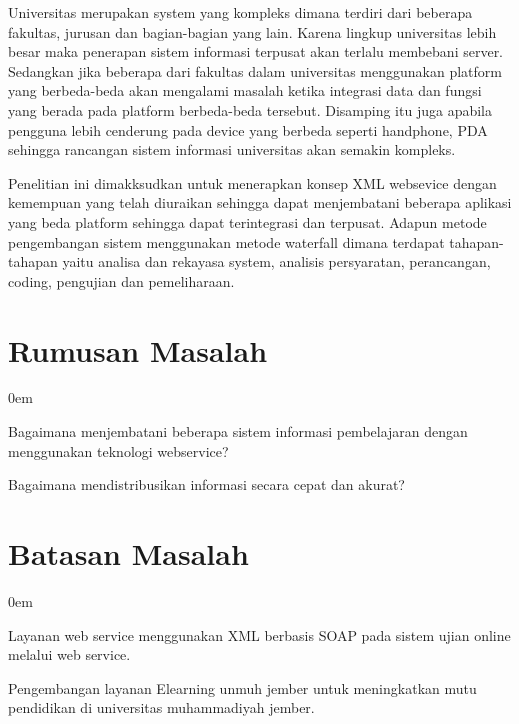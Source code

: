 \documentclass{jtetiproposalskripsi}
\begin{document}
Universitas merupakan system yang kompleks dimana terdiri dari beberapa fakultas, jurusan dan bagian-bagian yang lain. Karena lingkup universitas lebih besar maka penerapan sistem informasi terpusat akan terlalu membebani server.  Sedangkan jika beberapa dari fakultas dalam universitas menggunakan platform yang berbeda-beda akan mengalami masalah ketika integrasi data dan fungsi yang berada pada platform berbeda-beda tersebut. Disamping itu juga apabila pengguna lebih cenderung pada device yang berbeda seperti handphone, PDA sehingga rancangan sistem informasi universitas akan semakin kompleks.

Penelitian ini dimakksudkan untuk menerapkan konsep XML websevice dengan kemempuan yang telah diuraikan sehingga dapat menjembatani beberapa aplikasi yang beda platform sehingga dapat terintegrasi dan terpusat. Adapun metode pengembangan sistem menggunakan metode waterfall dimana terdapat tahapan-tahapan yaitu analisa dan rekayasa system, analisis persyaratan, perancangan, coding, pengujian dan pemeliharaan.



\section{Rumusan Masalah}
\vspace{-0.5cm}

\begin{enumerate}[a.]
\begin{singlespace}
\itemsep0em
\item Bagaimana menjembatani beberapa sistem informasi pembelajaran dengan menggunakan teknologi webservice?
\item Bagaimana mendistribusikan informasi secara cepat dan akurat?
\end{singlespace}
\end{enumerate}

\section{Batasan Masalah}
\vspace{-0.5cm}

\begin{enumerate}[a.]
\begin{singlespace}
\itemsep0em
\item Layanan web service menggunakan XML berbasis SOAP pada sistem ujian online melalui web service.
\item Pengembangan layanan Elearning unmuh jember untuk meningkatkan mutu pendidikan di universitas muhammadiyah jember.
\end{singlespace}
\end{enumerate}
\end{document}
